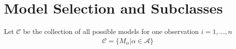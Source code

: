 \documentclass[Research_Module_ES.tex]{subfiles}
\begin{document}
\section{Model Selection and Subclasses}
Let $\mathcal{C}$ be the collection of all possible models for one observation $i=1,...,n$
\begin{align*}
	\mathcal{C}=\{M_\alpha|\alpha\in\mathcal{A}\}
\end{align*}
\end{document}
